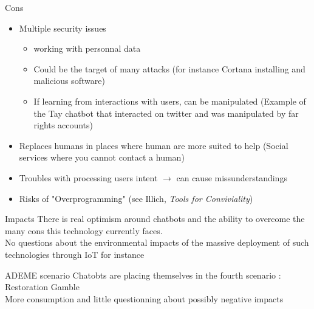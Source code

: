 \documentclass[11pt, aspectratio=169,]{beamer}
\begin{document}
\begin{frame}{Cons}
    \begin{itemize}
        \item Multiple security issues
        \begin{itemize}
            \item working with personnal data
            \item Could be the target of many attacks (for instance Cortana installing and  malicious software)
            \item If learning from interactions with users, can be manipulated (Example of the Tay chatbot that interacted on twitter and was manipulated by far rights accounts)
        \end{itemize}
        \item Replaces humans in places where human are more suited to help (Social services where you cannot contact a human)
        \item Troubles with processing users intent $\rightarrow$ can cause missunderstandings
        \item Risks of "Overprogramming" (see Illich, \emph{Tools for Conviviality})
    \end{itemize}
\end{frame}

\begin{frame}{Impacts}
    There is real optimism around chatbots and the ability to overcome the many cons this technology currently faces. \\
    No questions about the environmental impacts of the massive deployment of such technologies through IoT for instance
    \begin{block}{ADEME scenario}
    Chatobts are placing themselves in the fourth scenario : Restoration Gamble \\
    More consumption and little questionning about possibly negative impacts
    \end{block}
\end{frame}
\end{document}
